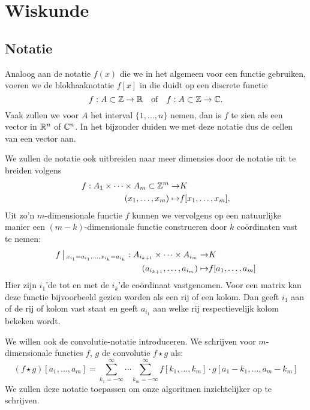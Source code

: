 \section{Wiskunde}

\subsection{Notatie}
Analoog aan de notatie $f(x)$ die we in het algemeen voor een functie gebruiken, voeren we de blokhaaknotatie $f[x]$ in die duidt op een discrete functie
\[
f:A\subset \mathbb{Z}\to \mathbb{R} \text{\quad of\quad} f:A\subset \mathbb{Z}\to \mathbb{C}.  
\]
Vaak zullen we voor $A$ het interval $\{1,\ldots,n\}$ nemen, 
dan is $f$ te zien als een vector in $\mathbb{R}^n$ of $\mathbb{C}^n$.
In het bijzonder duiden we met deze notatie dus de cellen van een vector aan.

We zullen de notatie ook uitbreiden naar meer dimensies door de notatie uit te breiden volgens
\begin{equation*}
\begin{split}
f: A_1\times \cdots \times A_m\subset \mathbb{Z}^m \to& K \\
       (x_1,\ldots,x_m) \mapsto& f[x_1,\ldots,x_m],
\end{split}
\end{equation*}
Uit zo'n $m$-dimensionale functie $f$ kunnen we vervolgens op een natuurlijke manier een \mbox{$(m-k)$-dimensionale}
functie construeren door $k$ co\"ordinaten vast te nemen:
\begin{equation*}
\begin{split}
f\,\big|\,_{x_{i_1}=a_{i_1},\ldots,x_{i_k}=a_{i_k}}: A_{i_{k+1}}\times\cdots\times A_{i_{m}} \to& K \\
(a_{i_{k+1}},\ldots,a_{i_{m}}) \mapsto& f[a_1,\ldots,a_m]
\end{split}
\end{equation*}
Hier zijn $i_1$'de tot en met de $i_k$'de co\"ordinaat vastgenomen. Voor een matrix kan deze functie
bijvoorbeeld gezien worden als een rij of een kolom. Dan geeft $i_1$ aan of de rij of kolom
vast staat en geeft $a_{i_1}$ aan welke rij respectievelijk kolom bekeken wordt.

We willen ook de convolutie-notatie introduceren. We schrijven voor $m$-dimensionale functies $f$, $g$
de convolutie $f\star g$ als:
\[
(f\star g)[a_1,\ldots,a_m] = \sum_{k_1=-\infty}^\infty\cdots \sum_{k_m=-\infty}^\infty
f[k_1,\ldots,k_m]\cdot g[a_1-k_1,\ldots,a_m-k_m]
\]
We zullen deze notatie toepassen om onze algoritmen inzichtelijker op te schrijven.

